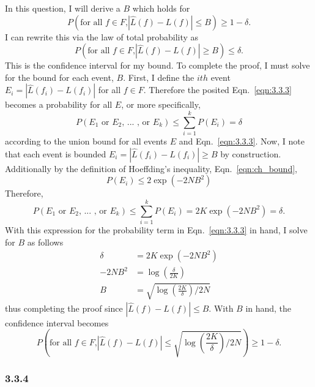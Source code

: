 \documentclass[12pt]{amsart}
\begin{document}
In this question, I will derive a $B$ which holds for
\begin{equation}
P(\text{for all $f \in F$,} |\hat{L}(f) - L(f)| \leq B) \geq 1 - \delta.
\end{equation}
I can rewrite this via the law of total probability as
\begin{equation} \label{eqn:3.3.3}
P(\text{for all $f \in F$,} |\hat{L}(f) - L(f)| \geq B) \leq \delta.
\end{equation}
This is the confidence interval for my bound.  To complete the proof, I must solve for the bound for each event, $B$.  First, I define the $ith$ event $E_i = |\hat{L}(f_i) - L(f_i)|$ for all $f \in F$.  Therefore the posited Eqn.~\ref{eqn:3.3.3} becomes a probability for all $E$, or more specifically,
\begin{equation}
P(E_1 \text{ or } E_2 \text{, ... , or } E_k) \leq \sum_{i = 1}^k P(E_i) = \delta
\end{equation}
according to the union bound for all events $E$ and Eqn.~\ref{eqn:3.3.3}.  Now, I note that each event is bounded $E_i = |\hat{L}(f_i) - L(f_i)| \geq B$ by construction.  
Additionally by the definition of Hoeffding's inequality, Eqn.~\ref{eqn:ch_bound},
\begin{equation}
P(E_i) \leq 2\exp(-2NB^2)
\end{equation}
Therefore, 
\begin{equation}
P(E_1 \text{ or } E_2 \text{, ... , or } E_k) \leq \sum_{i = 1}^k P(E_i) = 2K \exp(-2NB^2) = \delta.
\end{equation}
With this expression for the probability term in Eqn.~\ref{eqn:3.3.3} in hand, I solve for $B$ as follows
\begin{equation} \label{eqn:b}
\begin{split}
\delta & = 2K \exp(-2NB^2) \\
-2NB^2 & = \log(\frac{\delta}{2K}) \\
B & = \sqrt{\log(\frac{2K}{\delta})/2N}
\end{split}
\end{equation}
thus completing the proof since $|\hat{L}(f) - L(f)| \leq B$.  With $B$ in hand, the confidence interval becomes
\begin{equation}
P(\text{for all $f \in F$,} |\hat{L}(f) - L(f)| \leq \sqrt{\log(\frac{2K}{\delta})/2N}) \geq 1 - \delta.
\end{equation}

\subsubsection*{3.3.4}
\end{document}
